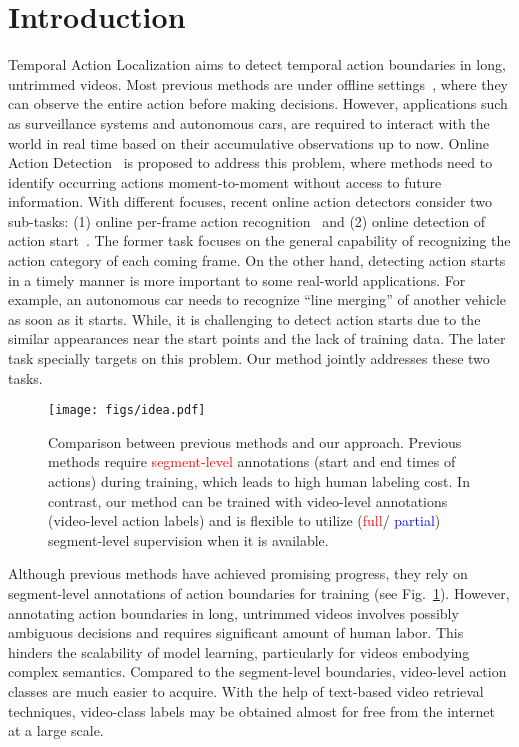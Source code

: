 \documentclass[final]{cvpr}
\begin{document}
\section{Introduction}
Temporal Action Localization aims to detect temporal action boundaries in long, untrimmed videos. Most previous methods are under offline settings~\cite{buch2017sst,chao2018rethinking,dai2017temporal,gao2017turn,shou2016temporal,zhao2017temporal}, where they can observe the entire action before making decisions. However, applications such as surveillance systems and autonomous cars, are required to interact with the world in real time based on their accumulative observations up to now. Online Action Detection~\cite{de2016online} is proposed to address this problem, where methods need to identify occurring actions moment-to-moment without access to future information. With different focuses, recent online action detectors consider two sub-tasks: (1) online per-frame action recognition~\cite{de2016online,gao2017red,xu2019trn} and (2) online detection of action start~\cite{gao2019startnet,shou2018online}. The former task focuses on the general capability of recognizing the action category of each coming frame. On the other hand, detecting action starts in a timely manner is more important to some real-world applications. For example, an autonomous car needs to recognize ``line merging'' of another vehicle as soon as it starts. While, it is challenging to detect action starts due to the similar appearances near the start points and the lack of training data. The later task specially targets on this problem. Our method jointly addresses these two tasks. 
\begin{figure}[t]
    \centering
    \texttt{[image: figs/idea.pdf]}
    \caption{Comparison between previous methods and our approach. Previous methods require \textcolor{red}{segment-level} annotations (start and end times of actions) during training, which leads to high human labeling cost. In contrast, our method can be trained with \textcolor{OliveGreen}{video-level} annotations (video-level action labels) and is flexible to utilize (\textcolor{red}{full}/ \textcolor{blue}{partial}) segment-level supervision when it is available.}
    \label{fig: idea}
\end{figure}

Although previous methods have achieved promising progress, they rely on segment-level annotations of action boundaries for training (see Fig.~\ref{fig: idea}). However, annotating action boundaries in long, untrimmed videos involves possibly ambiguous decisions and requires significant amount of human labor. This hinders the scalability of model learning, particularly for videos embodying complex semantics. Compared to the segment-level boundaries, video-level action classes are much easier to acquire. With the help of text-based video retrieval techniques, video-class labels may be obtained almost for free from the internet at a large scale.
\end{document}
